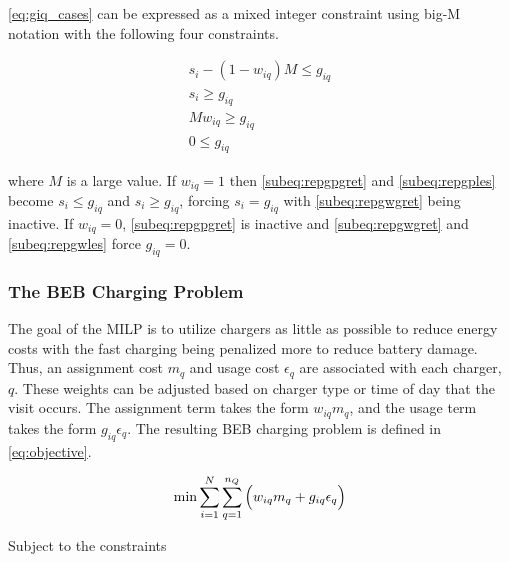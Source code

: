 \documentclass[ee,msthesis]{usuthesis}
\begin{document}
\autoref{eq:giq_cases} can be expressed as a mixed integer constraint using big-M notation with the following four
constraints.

\begin{subequations}
    \label{eq:slack_gain}
\begin{align}
    s_i - (1 - w_{iq})M \leq g_{iq}  \label{subeq:repgpgret} \\
    s_i \geq g_{iq}                 \label{subeq:repgples} \\
    Mw_{iq} \geq g_{iq}              \label{subeq:repgwgret} \\
    0 \leq g_{iq}                   \label{subeq:repgwles}
\end{align}
\end{subequations}

\noindent
where \(M\) is a large value. If \(w_{iq} = 1\) then \autoref{subeq:repgpgret} and \autoref{subeq:repgples} become \(s_i \leq
g_{iq}\) and \(s_i \geq g_{iq}\), forcing \(s_i = g_{iq}\) with \autoref{subeq:repgwgret} being inactive. If \(w_{iq} = 0\),
\autoref{subeq:repgpgret} is inactive and \autoref{subeq:repgwgret} and \autoref{subeq:repgwles} force \(g_{iq} = 0\).

\subsubsection{The BEB Charging Problem}
\label{sec:BEB_MILP}
The goal of the MILP is to utilize chargers as little as possible to reduce energy costs with the fast charging being
penalized more to reduce battery damage. Thus, an assignment cost \(m_q\) and usage cost \(\epsilon_q\) are associated with each
charger, \(q\). These weights can be adjusted based on charger type or time of day that the visit occurs. The assignment
term takes the form \(w_{iq}m_q\), and the usage term takes the form \(g_{iq} \epsilon_q\). The resulting BEB charging problem is
defined in \autoref{eq:objective}.

\begin{equation}
\label{eq:objective}
	\min \sum_{i=1}^N \sum_{q=1}^{n_Q} \Big( w_{iq} m_q + g_{iq} \epsilon_q \Big) \\
\end{equation}

Subject to the constraints
\end{document}
